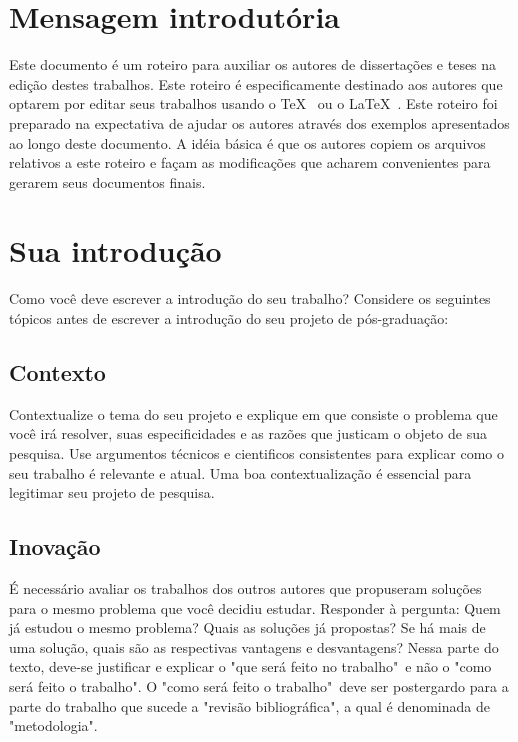 \section{Mensagem introdutória}
Este documento é um roteiro para auxiliar os autores de
dissertações e teses na edição destes trabalhos.
Este roteiro é especificamente destinado aos autores que optarem
por editar seus trabalhos usando o \TeX\ \cite{knuth:tex,texbook} ou o \LaTeX\ \cite{lamport:latex,latexbook}.
Este roteiro foi preparado na expectativa de ajudar os autores
através dos exemplos apresentados ao longo deste documento. A
idéia básica é que os autores copiem os arquivos
relativos a este roteiro e façam as modificações que
acharem convenientes para gerarem seus documentos finais.

\section{Sua introdução}
Como você deve escrever a introdução do seu trabalho? Considere os seguintes tópicos antes de escrever a introdução do seu projeto de pós-graduação:

\subsection{Contexto}
Contextualize o tema do seu projeto e explique em que consiste o problema que você irá resolver, suas especificidades e as razões que justicam o objeto de sua pesquisa. Use argumentos técnicos e cientificos consistentes para explicar como o seu trabalho é relevante e  atual. Uma boa contextualização é essencial para legitimar seu projeto de pesquisa.

\subsection{Inovação}
É necessário avaliar os trabalhos dos outros autores que propuseram soluções para o mesmo problema que você decidiu estudar. Responder à pergunta: Quem já estudou o mesmo problema? Quais as soluções já propostas? Se há mais de uma solução, quais são as respectivas vantagens e desvantagens? Nessa parte do texto, deve-se justificar e explicar o "que será feito no trabalho"\ e não o "como será feito o trabalho". O "como será feito o trabalho"\ deve ser postergardo para a parte do trabalho que sucede a "revisão bibliográfica", a qual é denominada de "metodologia".

